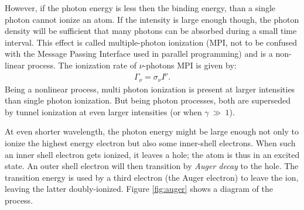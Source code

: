 However, if the photon energy is less then the binding energy, than a single
photon cannot ionize an atom. If the intensity is large enough though, the
photon density will be sufficient that many photons can be absorbed during a
small time interval.
This effect is called multiple-photon ionization (MPI, not to
be confused with the Message Passing Interface used in parallel programming) and
is a non-linear process. The ionization rate of $\nu$-photons MPI is given
by\cite{Fennel2010}:
\begin{align}
\Gamma_{\nu} = \sigma_{\nu} I^{\nu}.
\label{eqn:ionization:rate:mpi}
\end{align}
Being a nonlinear process, multi photon ionization is present at larger
intensities than single photon ionization. But being photon processes, both are
superseded by tunnel ionization at even larger intensities (or when
$\gamma~\gg~1$).


{}

At even shorter wavelength, the photon energy might be large enough not only
to ionize the highest energy electron but also some inner-shell electrons.
When such an inner shell electron gets ionized, it leaves a hole; the atom is
thus in an excited state. An outer shell electron will then transition by
\textit{Auger decay} to the hole. The transition energy is used by a third
electron (the Auger electron) to leave the ion, leaving the latter
doubly-ionized. Figure \ref{fig:auger} shows a diagram of the process.

